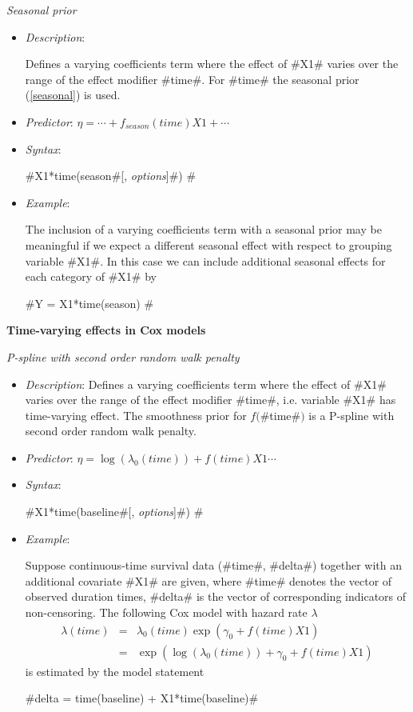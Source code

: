 {\em Seasonal prior}
\begin{itemize}
\item[] {\em Description}:

Defines a varying coefficients term where the effect of #X1#
varies over the range of the effect modifier #time#. For #time#
the seasonal prior (\ref{seasonal}) is used.
\item[] {\em Predictor}: $\eta= \cdots + f_{season}(time)X1 + \cdots $
\item[] {\em Syntax}:

#X1*time(season#[, {\em options}]#) #
\item[] {\em Example}:

The inclusion of a varying coefficients term with a seasonal prior
may be meaningful if we expect a different seasonal effect with
respect to grouping variable #X1#. In this case we can include
additional seasonal effects for each category of #X1# by

#Y = X1*time(season) #

\end{itemize}

{\bf Time-varying effects in Cox models}
\medskip

{\em P-spline with second order random walk penalty}

\begin{itemize}
\item[] {\em Description}: Defines a varying coefficients term
where the effect of #X1# varies over the range of the effect
modifier #time#, i.e. variable #X1# has time-varying effect. The
smoothness prior for $f($#time#$)$ is a P-spline with second order
random walk penalty.

 \item[] {\em Predictor}: $\eta = \log(\lambda_0(time)) +
f(time)X1 \cdots$ \item[] {\em Syntax}:

 #X1*time(baseline#[, {\em options}]#) #
 \item[] {\em Example}:

Suppose continuous-time survival data (#time#, #delta#) together
with an additional covariate #X1# are given, where #time# denotes
the vector of observed duration times, #delta# is the vector of
corresponding indicators of non-censoring. The following Cox model
with hazard rate $\lambda$
\begin{eqnarray*}
 \lambda(time) & = & \lambda_0(time)\exp(\gamma_0 + f(time)X1)\\
 & = & \exp\left(\log(\lambda_0(time)) + \gamma_0 + f(time)X1\right)
\end{eqnarray*}
is estimated by the model statement

#delta = time(baseline) + X1*time(baseline)#

\end{itemize}


